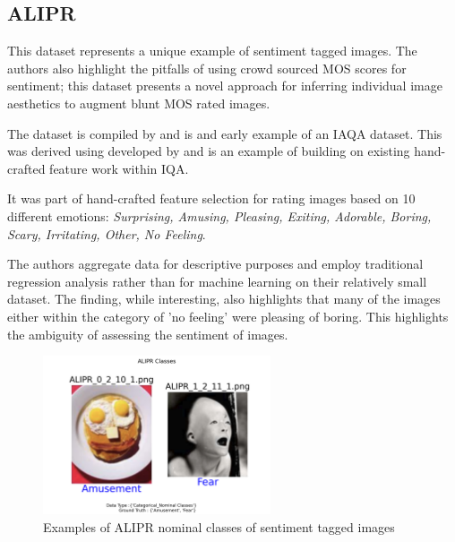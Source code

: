 \subsection{ALIPR}


This dataset represents a unique example of sentiment tagged images. The 
authors also highlight the pitfalls of using crowd sourced MOS scores for sentiment; this dataset presents a novel approach for inferring individual image aesthetics to augment blunt MOS rated images. 

The dataset is compiled by \cite{Datta2008} and is and early example of an IAQA dataset. This was derived using \cite{Li2003} developed by \citeauthor{Wang2002} and is an example of building on existing hand-crafted feature work within IQA. 

It was part of hand-crafted feature selection for rating images based on 10 different emotions: \textit{Surprising, Amusing, Pleasing, Exiting, Adorable, Boring, Scary, Irritating, Other, No Feeling}. 


The authors aggregate data for descriptive purposes and employ traditional regression analysis rather than for machine learning on their relatively small dataset. The finding, while interesting, also highlights that many of the images either within the category of 'no feeling' were pleasing of boring. This highlights the ambiguity of assessing the sentiment of images.



\begin{figure}[hp]
\centering
 \includegraphics[width=0.6\textwidth]{figures/database_ims/ALIPR Classes.png}
 
  \caption{\label{fig:ALIPR} Examples of ALIPR nominal classes of sentiment tagged images}
  \label{fig:ALIPR_}
\end{figure}



